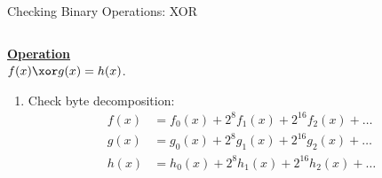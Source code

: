 \begin{frame}{Checking Binary Operations: XOR}
\begin{columns}
\footnotesize
\begin{column}{0.5\textwidth}
\begin{center}
\underline{\textbf{Operation}} \\[0.2cm]
$f(x) \xor g(x) = h(x)$.
\end{center}
\begin{enumerate}
\item Check byte decomposition:
\begin{align*}
f(x) &= f_0(x) + 2^8 f_1(x) + 2^{16} f_2(x) + \dots \\
g(x) &= g_0(x) + 2^8 g_1(x) + 2^{16} g_2(x) + \dots \\
h(x) &= h_0(x) + 2^8 h_1(x) + 2^{16} h_2(x) + \dots
\end{align*}


\end{enumerate}
\end{column}
\end{columns}
\end{frame}
